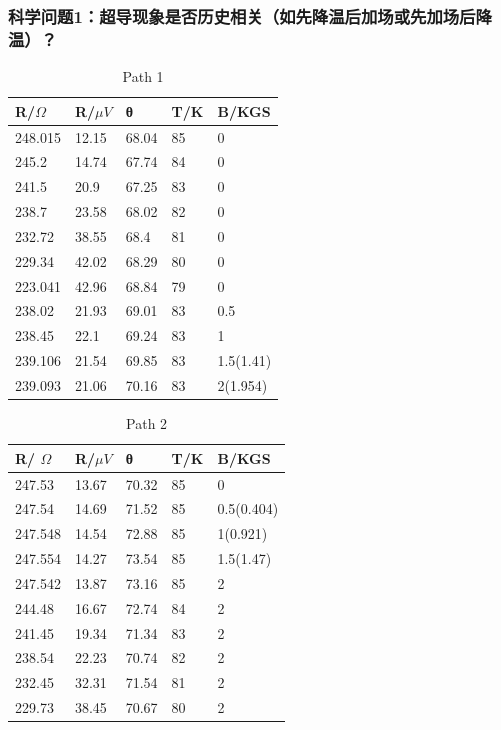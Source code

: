 \documentclass{ctexart}
\theoremstyle{ansstyle}
\begin{document}
\subsubsection{科学问题1：超导现象是否历史相关（如先降温后加场或先加场后降温）？}
\begin{table}[H]
    \centering
    \begin{tabular}{@{}lllll@{}}
        \toprule
        R/$ \Omega $ & R/$\mu V$ & θ     & T/K & B/KGS     \\ \midrule
        248.015      & 12.15     & 68.04 & 85  & 0         \\
        245.2        & 14.74     & 67.74 & 84  & 0         \\
        241.5        & 20.9      & 67.25 & 83  & 0         \\
        238.7        & 23.58     & 68.02 & 82  & 0         \\
        232.72       & 38.55     & 68.4  & 81  & 0         \\
        229.34       & 42.02     & 68.29 & 80  & 0         \\
        223.041      & 42.96     & 68.84 & 79  & 0         \\
        238.02       & 21.93     & 69.01 & 83  & 0.5       \\
        238.45       & 22.1      & 69.24 & 83  & 1         \\
        239.106      & 21.54     & 69.85 & 83  & 1.5(1.41) \\
        239.093      & 21.06     & 70.16 & 83  & 2(1.954)  \\ \bottomrule
    \end{tabular}
    \caption {Path 1 }
\end{table}
\begin{table}[H]
    \centering
    \begin{tabular}{@{}lllll@{}}

        \toprule
        R/ $ \Omega $ & R/$\mu V$ & θ     & T/K & B/KGS      \\ \midrule
        247.53        & 13.67     & 70.32 & 85  & 0          \\
        247.54        & 14.69     & 71.52 & 85  & 0.5(0.404) \\
        247.548       & 14.54     & 72.88 & 85  & 1(0.921)   \\
        247.554       & 14.27     & 73.54 & 85  & 1.5(1.47)  \\
        247.542       & 13.87     & 73.16 & 85  & 2          \\
        244.48        & 16.67     & 72.74 & 84  & 2          \\
        241.45        & 19.34     & 71.34 & 83  & 2          \\
        238.54        & 22.23     & 70.74 & 82  & 2          \\
        232.45        & 32.31     & 71.54 & 81  & 2          \\
        229.73        & 38.45     & 70.67 & 80  & 2          \\ \bottomrule
    \end{tabular}
    \caption{Path 2}
\end{table}
\end{document}
